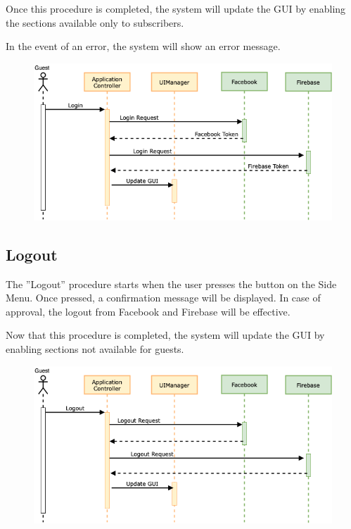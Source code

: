\documentclass[numbers=noenddot, 12pt, a4paper, oneside]{scrbook}
\begin{document}
Once this procedure is completed, the system will update the GUI by enabling the sections available only to subscribers.

In the event of an error, the system will show an error message.

\begin{figure}[H]
	\centering
	\includegraphics[width=1\textwidth]{images/Sequence/Login}
\end{figure}
\newpage

\subsection*{Logout}
The ”Logout” procedure starts when the user presses the button on the Side Menu. Once pressed, a confirmation message will be displayed. In case of approval, the logout from Facebook and Firebase will be effective.

Now that this procedure is completed, the system will update the GUI by enabling sections not available for guests.


\begin{figure}[H]
	\centering
	\includegraphics[width=1\textwidth]{images/Sequence/Logout}
\end{figure}
\newpage
\end{document}
